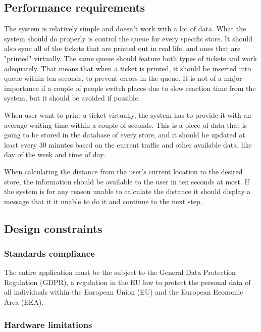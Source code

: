 \FloatBarrier
\newpage
\subsection{Performance requirements}

\hspace{\parindent}The system is relatively simple and doesn't work with a lot of data. What the system should do properly is control the queue for every specific store. It should also sync all of the tickets that are printed out in real life, and ones that are "printed" virtually. The same queue should feature both types of tickets and work adequately. That means that when a ticket is printed, it should be inserted into queue within ten seconds, to prevent errors in the queue. It is not of a major importance if a couple of people switch places due to slow reaction time from the system, but it should be avoided if possible. 


When user want to print a ticket virtually, the system has to provide it with an average waiting time within a couple of seconds. This is a piece of data that is going to be stored in the database of every store, and it should be updated at least every 30 minutes based on the current traffic and other available data, like day of the week and time of day.


When calculating the distance from the user's current location to the desired store, the information should be available to the user in ten seconds at most. If the system is for any reason unable to calculate the distance it should display a message that it it unable to do it and continue to the next step.

\newpage

\subsection{Design constraints}

\subsubsection{Standards compliance}
\hspace{\parindent}The entire application must be the subject to the General Data Protection Regulation (GDPR), a regulation in the EU law to protect the personal data of all individuals within the European Union (EU) and the European Economic Area (EEA).

\subsubsection{Hardware limitations} \label{hardware}

